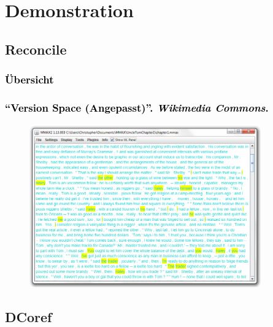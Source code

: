 \documentclass[xcolor=dvipsnames]{beamer}
\begin{document}

\section{Demonstration}


\subsection{Reconcile}


\begin{frame}[plain]\frametitle{\textcolor{black}{Übersicht}}


\end{frame}

\addtocounter{framenumber}{-1}


\begin{frame}\frametitle{\textcolor{black}{``{Version Space (Angepasst)}''. \emph{Wikimedia Commons}.}}
\begin{figure}
\includegraphics[height=7cm]{cm_mmax.jpg}
\end{figure}

\end{frame}


\subsection{DCoref}
\end{document}
